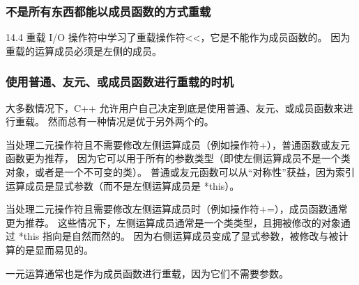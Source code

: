 \documentclass[../../LearnCpp.tex]{subfiles}
\begin{document}
\subsubsection*{不是所有东西都能以成员函数的方式重载}

14.4 重载 I/O 操作符中学习了重载操作符<<，它是不能作为成员函数的。
因为重载的运算成员必须是左侧的成员。

\subsubsection*{使用普通、友元、或成员函数进行重载的时机}

大多数情况下，C++ 允许用户自己决定到底是使用普通、友元、或成员函数来进行重载。
然而总有一种情况是优于另外两个的。

当处理二元操作符且不需要修改左侧运算成员（例如操作符+），普通函数或友元函数更为推荐，
因为它可以用于所有的参数类型（即使左侧运算成员不是一个类对象，或者是一个不可变的类）。
普通或友元函数可以从“对称性”获益，因为索引运算成员是显式参数（而不是左侧运算成员是 *this）。

当处理二元操作符且需要修改左侧运算成员时（例如操作符+=），成员函数通常更为推荐。
这些情况下，左侧运算成员通常是一个类类型，且拥被修改的对象通过 *this 指向是自然而然的。
因为右侧运算成员变成了显式参数，被修改与被计算的是显而易见的。

一元运算通常也是作为成员函数进行重载，因为它们不需要参数。
\end{document}
